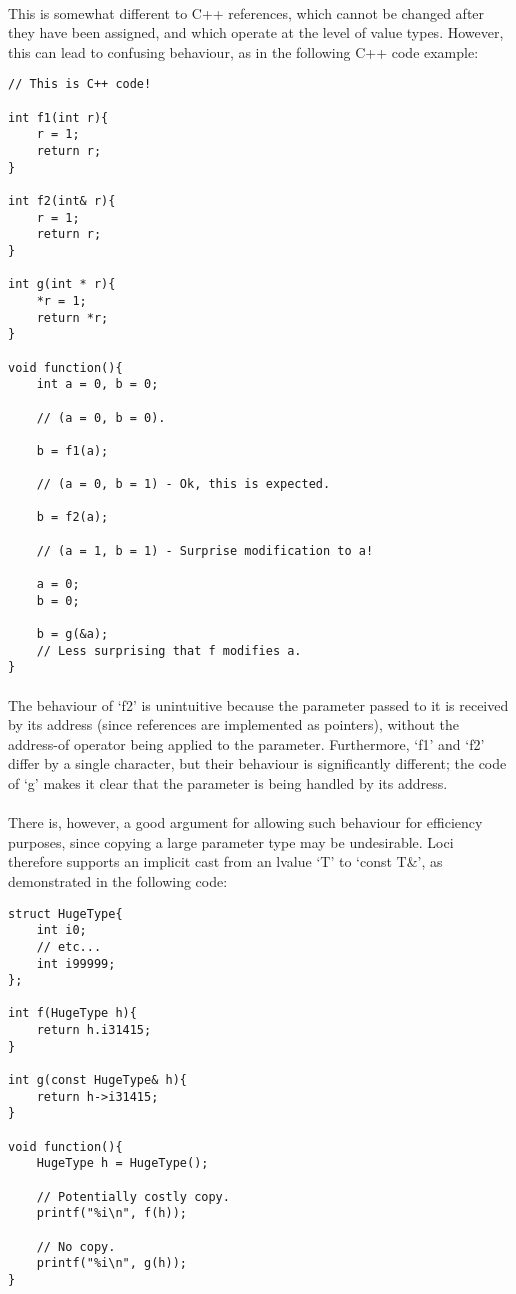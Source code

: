 \documentclass[12pt,twoside,notitlepage]{report}
\begin{document}
\paragraph{}
This is somewhat different to C++ references, which cannot be changed after they have been assigned, and which operate at the level of value types. However, this can lead to confusing behaviour, as in the following C++ code example:

\small{
\begin{verbatim}
// This is C++ code!

int f1(int r){
    r = 1;
    return r;
}

int f2(int& r){
    r = 1;
    return r;
}

int g(int * r){
    *r = 1;
    return *r;
}

void function(){
    int a = 0, b = 0;
    
    // (a = 0, b = 0).
    
    b = f1(a);
    
    // (a = 0, b = 1) - Ok, this is expected.
    
    b = f2(a);
    
    // (a = 1, b = 1) - Surprise modification to a!
    
    a = 0;
    b = 0;
    
    b = g(&a);
    // Less surprising that f modifies a.
}
\end{verbatim}
}

\paragraph{}
The behaviour of `f2' is unintuitive because the parameter passed to it is received by its address (since references are implemented as pointers), without the address-of operator being applied to the parameter. Furthermore, `f1' and `f2' differ by a single character, but their behaviour is significantly different; the code of `g' makes it clear that the parameter is being handled by its address.

\paragraph{}
There is, however, a good argument for allowing such behaviour for efficiency purposes, since copying a large parameter type may be undesirable. Loci therefore supports an implicit cast from an lvalue `T' to `const T\&', as demonstrated in the following code:

\small{
\begin{verbatim}
struct HugeType{
    int i0;
    // etc...
    int i99999;
};

int f(HugeType h){
    return h.i31415;
}

int g(const HugeType& h){
    return h->i31415;
}

void function(){
    HugeType h = HugeType();
    
    // Potentially costly copy.
    printf("%i\n", f(h));
    
    // No copy.
    printf("%i\n", g(h));
}
\end{verbatim}
}
\end{document}
